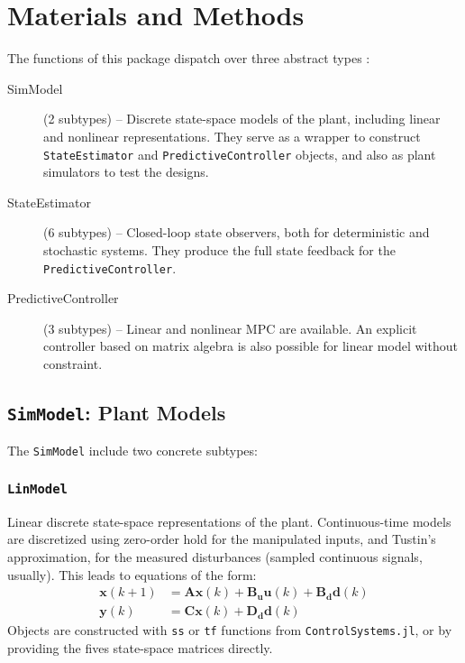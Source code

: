 
\section{Materials and Methods}

The functions of this package dispatch over three abstract types :
\begin{description}
    \item[SimModel] (2 subtypes) -- Discrete state-space models of the plant, including linear and nonlinear representations. They serve as a wrapper to construct \texttt{StateEstimator} and \texttt{PredictiveController} objects, and also as plant simulators to test the designs.
    \item[StateEstimator] (6 subtypes) -- Closed-loop state observers, both for deterministic and stochastic systems. They produce the full state feedback for the \texttt{PredictiveController}.
    \item[PredictiveController] (3 subtypes) -- Linear and nonlinear MPC are available. An explicit controller based on matrix algebra is also possible for linear model without constraint.
\end{description}




\subsection{\texttt{SimModel}: Plant Models}

The \texttt{SimModel} include two concrete subtypes:

\subsubsection{\texttt{LinModel}}

Linear discrete state-space representations of the plant. Continuous-time models are discretized using zero-order hold for the manipulated inputs, and Tustin's approximation, for the measured disturbances (sampled continuous signals, usually). This leads to equations of the form:
\begin{subequations}
\begin{align}
    \mathbf{x}(k+1) &= \mathbf{A x}(k) + \mathbf{B_u u}(k) + \mathbf{B_d d}(k) \\
    \mathbf{y}(k)   &= \mathbf{C x}(k) + \mathbf{D_d d}(k)
\end{align}
\end{subequations}
Objects are constructed with \texttt{ss} or \texttt{tf} functions from \texttt{ControlSystems.jl}, or by providing the fives state-space matrices directly.

